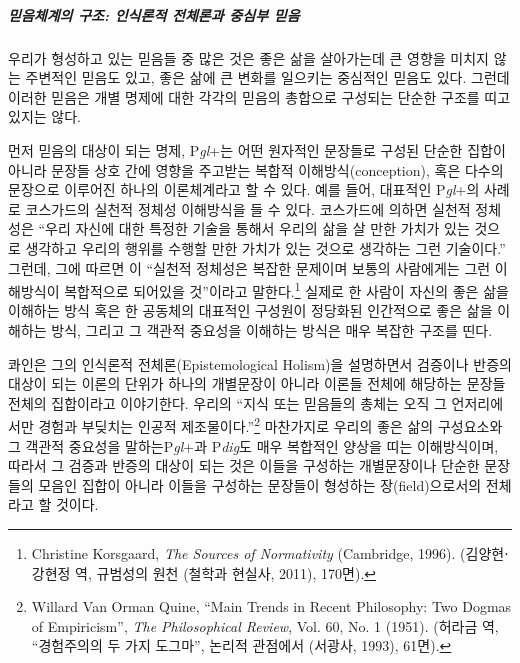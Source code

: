 \subparagraph{믿음체계의 구조: 인식론적 전체론과 중심부 믿음}

우리가 형성하고 있는 믿음들 중 많은 것은 좋은 삶을 살아가는데 큰 영향을 미치지 않는 주변적인 믿음도 있고, 좋은 삶에 큰 변화를 일으키는 중심적인 믿음도 있다. 그런데 이러한 믿음은 개별 명제에 대한 각각의 믿음의 총합으로 구성되는 단순한 구조를 띠고 있지는 않다.

먼저 믿음의 대상이 되는 명제, P\emph{gl}+는 어떤 원자적인 문장들로 구성된 단순한 집합이 아니라 문장들 상호 간에 영향을 주고받는 복합적 이해방식(conception), 혹은 다수의 문장으로 이루어진 하나의 이론체계라고 할 수 있다. 예를 들어, 대표적인 P\emph{gl}+의 사례로 코스가드의 실천적 정체성 이해방식을 들 수 있다. 코스가드에 의하면 실천적 정체성은 ``우리 자신에 대한 특정한 기술을 통해서 우리의 삶을 살 만한 가치가 있는 것으로 생각하고 우리의 행위를 수행할 만한 가치가 있는 것으로 생각하는 그런 기술이다.'' 그런데, 그에 따르면 이 ``실천적 정체성은 복잡한 문제이며 보통의 사람에게는 그런 이해방식이 복합적으로 되어있을 것''이라고 말한다.\footnote{Christine Korsgaard, \emph{The Sources of Normativity} (Cambridge, 1996). (김양현⋅강현정 역, 규범성의 원천 (철학과 현실사, 2011), 170면).} 실제로 한 사람이 자신의 좋은 삶을 이해하는 방식 혹은 한 공동체의 대표적인 구성원이 정당화된 인간적으로 좋은 삶을 이해하는 방식, 그리고 그 객관적 중요성을 이해하는 방식은 매우 복잡한 구조를 띤다.

콰인은 그의 인식론적 전체론(Epistemological Holism)을 설명하면서 검증이나 반증의 대상이 되는 이론의 단위가 하나의 개별문장이 아니라 이론들 전체에 해당하는 문장들 전체의 집합이라고 이야기한다. 우리의 ``지식 또는 믿음들의 총체는 오직 그 언저리에서만 경험과 부딪치는 인공적 제조물이다.''\footnote{Willard Van Orman Quine, ``Main Trends in Recent Philosophy: Two Dogmas of Empiricism'', \emph{The Philosophical Review}, Vol. 60, No. 1 (1951). (허라금 역, ``경험주의의 두 가지 도그마'', 논리적 관점에서 (서광사, 1993), 61면).} 마찬가지로 우리의 좋은 삶의 구성요소와 그 객관적 중요성을 말하는P\emph{gl}+과 P\emph{dig}도 매우 복합적인 양상을 띠는 이해방식이며, 따라서 그 검증과 반증의 대상이 되는 것은 이들을 구성하는 개별문장이나 단순한 문장들의 모음인 집합이 아니라 이들을 구성하는 문장들이 형성하는 장(field)으로서의 전체라고 할 것이다.

